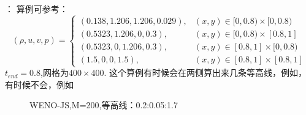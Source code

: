 \documentclass{book}
\begin{document}
\begin{example}[二维欧拉方程黎曼问题]{}{}：
    算例可参考：\cite{RN114}
    \begin{equation}
        (\rho, u, v, p)=\begin{cases}
            (0.138,1.206,1.206,0.029), & (x, y) \in[0,0.8) \times[0,0.8) \\
            (0.5323,1.206,0,0.3),      & (x, y) \in[0,0.8) \times[0.8,1] \\
            (0.5323,0,1.206,0.3),      & (x, y) \in[0.8,1] \times[0,0.8) \\
            (1.5,0,0,1.5),             & (x, y) \in[0.8,1] \times[0.8,1]
        \end{cases}
    \end{equation}
    $t_{end}=0.8$,网格为$400\times400$. 这个算例有时候会在两侧算出来几条等高线，例如\cite{ha2013modified,ha2016sixth,ha2024new}，有时候不会，例如\cite{fleischmann2019numerical,liang2024new,jeong2022development}

    \begin{figure}[H]%
        \centering
        \quad
        \caption{WENO-JS,M=200,等高线：0.2:0.05:1.7}
    \end{figure}
\end{example}
\end{document}
